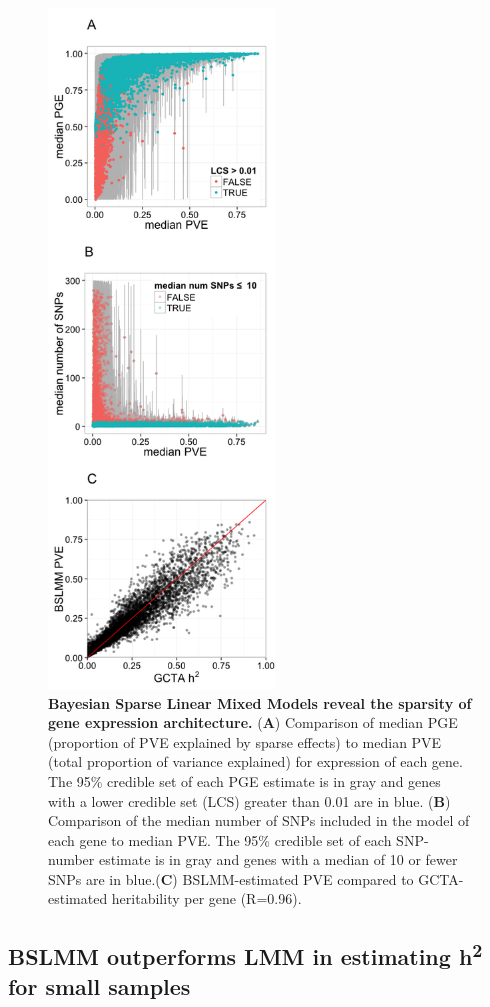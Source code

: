 \documentclass[10pt,letterpaper]{article}
\begin{document}
\begin{figure}[h]
\includegraphics[width=6cm]{Figures/Fig-DGN-BSLMM.png}
\caption{{\bf Bayesian Sparse Linear Mixed Models reveal the sparsity of gene expression architecture.} 
(\textbf{A}) Comparison of median PGE
(proportion of PVE explained by sparse effects) to median PVE (total
proportion of variance explained) for expression of each gene. The 95\%
credible set of each PGE estimate is in gray and genes with a lower
credible set (LCS) greater than 0.01 are in blue. (\textbf{B})
Comparison of the median number of SNPs included in the model of each
gene to median PVE. The 95\% credible set of each SNP-number estimate is
in gray and genes with a median of 10 or fewer SNPs are in blue.(\textbf{C}) 
BSLMM-estimated PVE compared to GCTA-estimated
heritability per gene (R=0.96).}
\label{fig-dgn-bslmm}
\end{figure}

\subsection*{BSLMM outperforms LMM in estimating h\textsuperscript{2}  for small samples}
\end{document}
